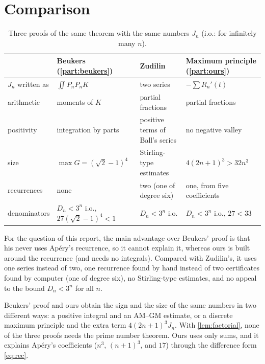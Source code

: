 \documentclass[11pt]{article}
\newcommand{\Dn}{D_n}
\theoremstyle{plain}
\theoremstyle{definition}
\theoremstyle{remark}
\begin{document}
\section{Comparison}\label{sec:comparison}

\begin{table}[ht]
\centering
\footnotesize
\begin{tabular}{@{}llll@{}}
\toprule
 & Beukers (\cref{part:beukers}) & Zudilin & Maximum principle (\cref{part:ours})\\
\midrule
$J_n$ written as & $\iint P_nP_nK$ & two series & $-\sum R_n'(t)$\\
arithmetic & moments of $K$ & partial fractions & partial fractions\\
positivity & integration by parts & positive terms of Ball's series & no negative valley\\
size & $\max G=(\sqrt2-1)^4$ & Stirling-type estimates & $4(2n+1)^3>32n^3$\\
recurrences & none & two (one of degree six) & one, from five coefficients\\
denominators & $\Dn<3^n$ i.o., $27(\sqrt2-1)^4<1$ & $\Dn<3^n$ i.o. & $\Dn<3^n$ i.o., $27<33$\\
\bottomrule
\end{tabular}
\caption{Three proofs of the same theorem with the same numbers $J_n$ (i.o.: for infinitely many $n$).}
\label{tab:comparison}
\end{table}

For the question of this report, the main advantage over Beukers' proof is that his never uses
Ap\'ery's recurrence, so it cannot explain it, whereas ours is built around the recurrence (and
needs no integrals). Compared with Zudilin's, it uses one series
instead of two, one recurrence found by hand instead of two certificates found by computer (one of
degree six), no Stirling-type estimates, and no appeal to the bound $\Dn<3^n$ for all $n$.

Beukers' proof and ours obtain the sign and the size of the same numbers in two different ways: a
positive integral and an AM--GM estimate, or a discrete maximum principle and the extra term $4(2n+1)^3J_n$. With
\cref{lem:factorial}, none of the three proofs needs the prime number theorem. Ours uses only sums, and it explains Ap\'ery's
coefficients ($n^3$, $(n+1)^3$, and $17$) through the difference form \eqref{eq:rec}.

\end{document}
